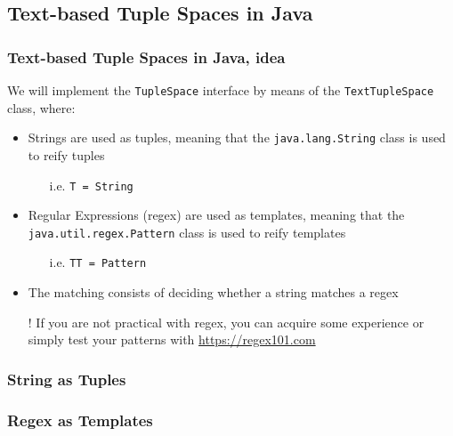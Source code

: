 \documentclass[presentation]{beamer}\mode<presentation>{\usetheme{AMSCesenaPurpleAndGold}}
\begin{document}
\subsection{Text-based Tuple Spaces in Java}

\begin{frame}%
\frametitle{Text-based Tuple Spaces in Java, idea}

We will implement the \texttt{TupleSpace} interface by means of the \texttt{\alert{Text}TupleSpace} class, where:
%
\vfill
%
\begin{itemize}	
\item Strings are used as tuples, meaning that the \texttt{java.lang.\alert{String}} class is used to reify tuples
%
\begin{itemize}
\item[i.e.] \texttt{T = String}
\end{itemize}



\item Regular Expressions (regex) are used as templates, meaning that the \texttt{java.util.regex.\alert{Pattern}} class is used to reify templates
%
\begin{itemize}
\item[i.e.] \texttt{TT = Pattern}
\end{itemize}



\item The matching consists of \alert{deciding} whether a string matches a regex

\vfill

\item[!] If you are not practical with regex, you can acquire some experience or simply test your patterns with \url{https://regex101.com}
\end{itemize}

\end{frame}

\begin{frame}
\frametitle{String as Tuples}


%
\end{frame}

\begin{frame}
\frametitle{Regex as Templates}



\end{frame}
\end{document}
